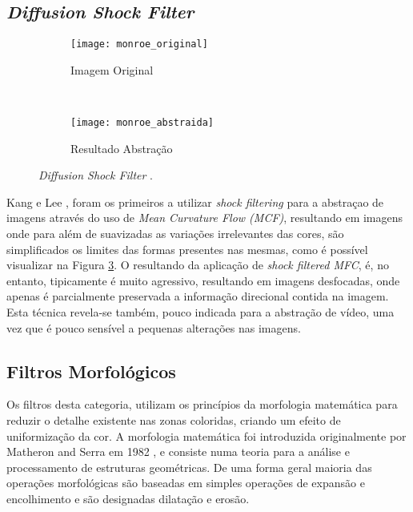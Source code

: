 \subsection{\textit{Diffusion Shock Filter}}
\begin{figure}
        \centering
        \begin{subfigure}[b]{0.3\textwidth}
                \centering
                \texttt{[image: monroe\_original]}
                \caption{Imagem Original}
                \label{fig:monroe_original}
        \end{subfigure}%
        ~ %
        \begin{subfigure}[b]{0.3\textwidth}
                \centering
                \texttt{[image: monroe\_abstraida]}
                \caption{Resultado Abstração}
                \label{fig:monroe_abstraida}
        \end{subfigure}
        \caption{\textit{Diffusion Shock Filter} \cite{Kang2008}.}\label{fig:diffusion_shock_filter}
\end{figure}
Kang e Lee \cite{Kang2008}, foram os primeiros a utilizar \textit{shock filtering} para a abstraçao de imagens através do uso de \textit{Mean Curvature Flow (MCF)}, resultando em imagens onde para além de suavizadas as variações irrelevantes das cores, são simplificados os limites das formas presentes nas mesmas, como é possível visualizar na Figura \ref{fig:diffusion_shock_filter}. O resultando da aplicação de \textit{shock filtered MFC}, é, no entanto, tipicamente é muito agressivo, resultando em imagens desfocadas, onde apenas é parcialmente preservada a  informação direcional contida na imagem. Esta técnica revela-se também, pouco indicada para a abstração de vídeo, uma vez que é pouco sensível a pequenas alterações nas imagens.

\subsection{Filtros Morfológicos}
Os filtros desta categoria, utilizam os princípios da morfologia matemática para reduzir o detalhe existente nas zonas coloridas, criando um efeito de uniformização da cor. A morfologia matemática foi introduzida originalmente por Matheron and Serra em 1982 \cite{serra1982image}, e consiste numa teoria para a análise e processamento de estruturas geométricas. De uma forma geral maioria das operações morfológicas são baseadas em simples operações de expansão e encolhimento e são designadas dilatação e erosão.

